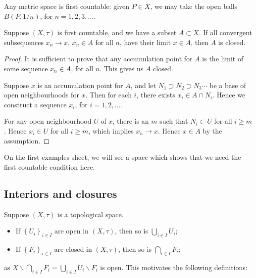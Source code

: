 \begin{example}
	Any metric space is first countable: given $P\in X$, we may take the open balls $B(P,1/n)$, for $n=1,2,3,\ldots$.
\end{example}

\begin{lemma}
	Suppose $(X,\tau)$ is first countable, and we have a subset $A\subset X$. If all convergent subsequences $x_n \to x$, $x_n \in A$ for all $n$, have their limit $x\in A$, then $A$ is closed.
\end{lemma}

\begin{proof}
	It is sufficient to prove that any accumulation point for $A$ is the limit of some sequence $x_n\in A$, for all $n$. This gives us $A$ closed.
	
	Suppose $x$ is an accumulation point for $A$, and let $N_1\supset N_2\supset N_3 \cdots$ be a base of open neighbourhoods for $x$. Then for each $i$, there exists $x_i\in A\cap N_i$. Hence we construct a sequence $x_i$, for $i=1,2,\ldots$.
	
	For any open neighbourhood $U$ of $x$, there is an $m$ such that $N_i\subset U$ for all $i\geq m$. Hence $x_i \in U$ for all $i\geq m$, which implies $x_n\to x$. Hence $x\in A$ by the assumption.
\end{proof}

On the first examples sheet, we will see a space which shows that we need the first countable condition here.


	\pagebreak

\subsection{Interiors and closures} %
\label{sub:interiors_and_closures}

Suppose $(X,\tau)$ is a topological space.
\begin{itemize}
	\shortskip
	\item If $\left\{U_i\right\}_{i\in I}$ are open in $(X,\tau)$, then so is $\bigcup_{i\in I} U_i$;
	\item If $\left\{F_i\right\}_{i\in I}$ are closed in $(X,\tau)$, then so is $\bigcap_{i\in I} F_i$;
\end{itemize}
as $X\backslash \bigcap_{i\in I} F_i = \bigcup_{i \in I} U_i \backslash F_i$ is open. This motivates the following definitions:

